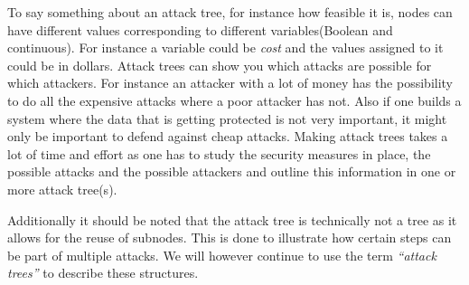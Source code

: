 To say something about an attack tree, for instance how feasible it is, nodes can have different values corresponding to different variables(Boolean and continuous).
For instance a variable could be \textit{cost} and the values assigned to it could be in dollars.
Attack trees can show you which attacks are possible for which attackers.
For instance an attacker with a lot of money has the possibility to do all the expensive attacks where a poor attacker has not.
Also if one builds a system where the data that is getting protected is not very important, it might only be important to defend against cheap attacks.
Making attack trees takes a lot of time and effort as one has to study the security measures in place, the possible attacks and the possible attackers and outline this information in one or more attack tree(s).\cite{schneier_attack_trees}

Additionally it should be noted that the attack tree is technically not a tree as it allows for the reuse of subnodes.
This is done to illustrate how certain steps can be part of multiple attacks.
We will however continue to use the term \emph{``attack trees''} to describe these structures.

